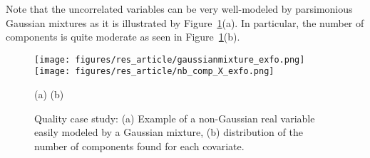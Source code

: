 \documentclass[12pt,a4paper]{report}
\begin{document}
\vspace{3mm}

Note that the uncorrelated variables can be very well-modeled by parsimonious Gaussian mixtures as it is illustrated by Figure~\ref{fig:graphMixmod.quality}(a). In particular, the number of components is quite moderate as seen in Figure~\ref{fig:graphMixmod.quality}(b).
		
		\begin{figure}[h!]
\begin{center}
			\texttt{[image: figures/res\_article/gaussianmixture\_exfo.png]}
			\texttt{[image: figures/res\_article/nb\_comp\_X\_exfo.png]}
\end{center}
\vspace{-5mm}
			\centerline{(a) \hspace{130px} (b)}
			\caption{Quality case study: (a) Example of a non-Gaussian real variable easily modeled by a Gaussian mixture, (b) distribution of the number of components found for each covariate.}\label{fig:graphMixmod.quality}
\end{figure}  	


%
%	
%
%		
%		
		
\end{document}
